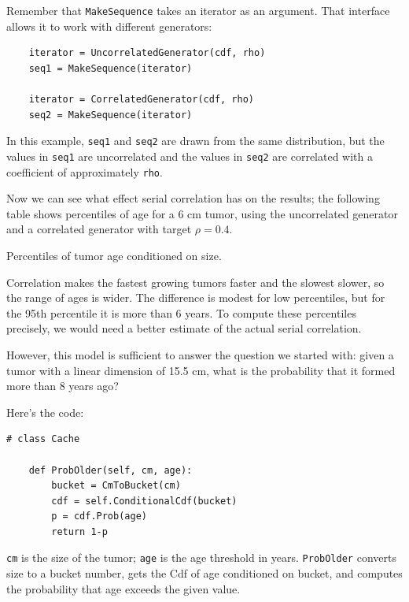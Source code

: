 \documentclass[12pt]{book}
\begin{document}
Remember that {\tt MakeSequence} takes an iterator as an argument.
That interface allows it to work with different generators:

\begin{verbatim}
    iterator = UncorrelatedGenerator(cdf, rho)
    seq1 = MakeSequence(iterator)

    iterator = CorrelatedGenerator(cdf, rho)
    seq2 = MakeSequence(iterator)
\end{verbatim}

In this example, {\tt seq1} and {\tt seq2} are
drawn from the same distribution, but the values in {\tt seq1}
are uncorrelated and the values in {\tt seq2} are correlated
with a coefficient of approximately {\tt rho}.

Now we can see what effect serial correlation has on the results;
the following table shows percentiles of age for a 6 cm tumor,
using the uncorrelated generator and a correlated generator
with target $\rho = 0.4$.

\begin{table}

\caption{Percentiles of tumor age conditioned on size.}
\end{table}

Correlation makes the fastest growing tumors faster and the slowest
slower, so the range of ages is wider.  The difference is modest for
low percentiles, but for the 95th percentile it is more than 6 years.
To compute these percentiles precisely, we would need a better
estimate of the actual serial correlation.

However, this model is sufficient to answer the question
we started with: given a tumor with a linear dimension of
15.5 cm, what is the probability that it formed more than
8 years ago?

Here's the code:

\begin{verbatim}
# class Cache

    def ProbOlder(self, cm, age):
        bucket = CmToBucket(cm)
        cdf = self.ConditionalCdf(bucket)
        p = cdf.Prob(age)
        return 1-p
\end{verbatim}

{\tt cm} is the size of the tumor; {\tt age} is the age threshold
in years.  {\tt ProbOlder} converts size to a bucket number,
gets the Cdf of age conditioned on bucket, and computes the
probability that age exceeds the given value.
\end{document}
